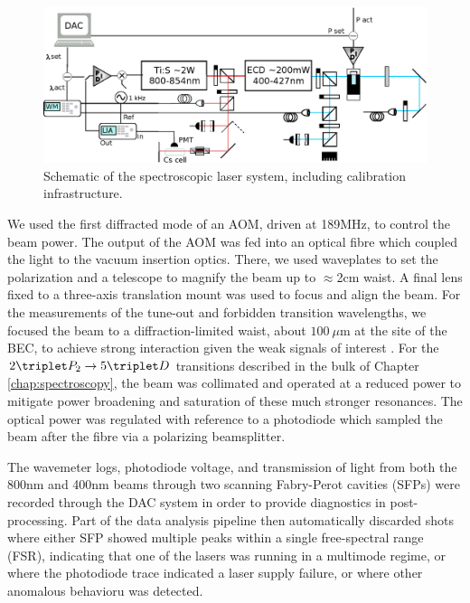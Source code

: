 	\begin{figure}
		\centering
		\includegraphics[width=\textwidth]{fig/apparatus/solstis_schematic_minim}
		\caption{Schematic of the spectroscopic laser system, including calibration infrastructure.}
		\label{fig:tunable_laser}
	\end{figure}
	

	We used the first diffracted mode of an AOM, driven at 189MHz, to control the beam power. The output of the AOM was fed into an optical fibre which coupled the light to the vacuum insertion optics. There, we used waveplates to set the polarization and a telescope to magnify the beam up to $\approx$2cm waist. A final lens fixed to a three-axis translation mount was used to focus and align the beam. For the measurements of the tune-out and forbidden transition wavelengths, we focused the beam to a diffraction-limited waist, about $100~\mu$m at the site of the BEC, to achieve strong interaction given the weak signals of interest . For the $2\triplet P_2\rightarrow 5\triplet D$ transitions described in the bulk of Chapter \ref{chap:spectroscopy}, the beam was collimated and operated at a reduced power to mitigate power broadening and saturation of these much stronger resonances. The optical power was regulated with reference to a photodiode which sampled the beam after the fibre via a polarizing beamsplitter.

	The wavemeter logs, photodiode voltage, and transmission of light from both the 800nm and 400nm beams through two scanning Fabry-Perot cavities (SFPs) were recorded through the DAC system in order to provide diagnostics in post-processing. Part of the data analysis pipeline then automatically discarded shots where either SFP showed multiple peaks within a single free-spectral range (FSR), indicating that one of the lasers was running in a multimode regime, or where the photodiode trace indicated a laser supply failure, or where other anomalous behavioru was detected.


